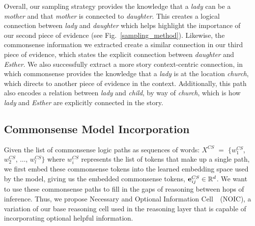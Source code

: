 \documentclass[11pt,a4paper]{article}
\newcommand{\R}{\mathbb{R}}
\def\figref#1{Fig.~\ref{#1}}
\newcommand{\fullModel}{NOIC}
\newcommand{\fullModelFullName}{Necessary and Optional Information Cell~}
\newcommand\bvect[1]{{\bf #1}}
\begin{document}
Overall, our sampling strategy provides the knowledge that a {\it lady} can be a  {\it mother} and that {\it mother} is connected to {\it daughter}. This creates a logical connection between {\it lady} and {\it daughter} which helps highlight the importance of our second piece of evidence (see \figref{sampling_method}). Likewise, the commonsense information we extracted create a similar connection in our third piece of evidence, which states the explicit connection between {\it daughter} and {\it Esther}.
We also successfully extract a more story context-centric connection, in which commonsense provides the knowledge that a {\it lady} is at the location {\it church}, which directs to another piece of evidence in the context. Additionally, this path also encodes a relation between  {\it lady} and {\it child}, by way of {\it church}, which is how {\it lady} and {\it Esther} are explicitly connected in the story.


\subsection{Commonsense Model Incorporation}
\label{sec:commonsense_model_inc}

Given the list of commonsense logic paths as sequences of words: $X^{CS}$ $=$ $\{{w}^{CS}_1$, ${w}^{CS}_2$, $\dots$, ${w}^{CS}_l\}$ where ${w}^{CS}_i$ represents the list of tokens that make up a single path, we first embed these commonsense tokens into the learned embedding space used by the model, giving us the embedded commonsense tokens, $\bvect{e}^{CS}_{ij} \in \R^d$.
We want to use these commonsense paths to fill in the gaps of reasoning between hops of inference.
Thus, we propose \fullModelFullName\ (\fullModel), a variation of our base reasoning cell used in the reasoning layer that is capable of incorporating optional helpful information.
 
\end{document}
